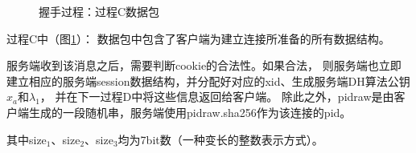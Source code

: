 \begin{small}
\begin{figure}[h]
{
}
\caption{握手过程：过程C数据包}\label{chap3:handshakec}
\end{figure}
\end{small}

过程C中（图\ref{chap3:handshakec}）：
数据包中包含了客户端为建立连接所准备的所有数据结构。

服务端收到该消息之后，需要判断cookie的合法性。如果合法，
则服务端也立即建立相应的服务端session数据结构，并分配好对应的xid、生成服务端DH算法公钥$x_a$和$\lambda_1$，
并在下一过程D中将这些信息返回给客户端。
除此之外，pidraw是由客户端生成的一段随机串，服务端使用pidraw.sha256作为该连接的pid。

其中size$_1$、size$_2$、size$_3$均为7bit数（一种变长的整数表示方式）。

